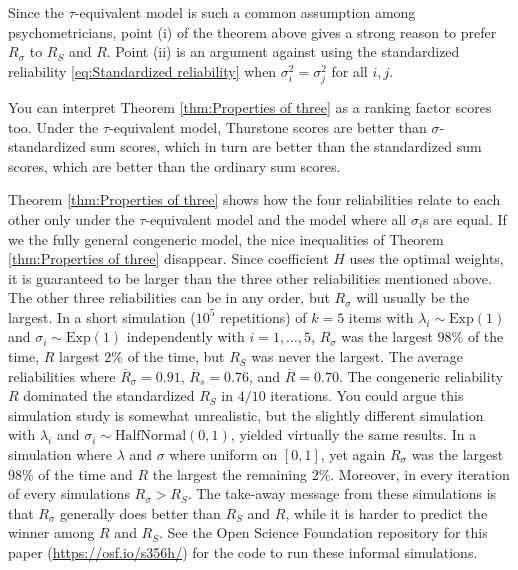 \documentclass[twoside]{article}
\begin{document}
Since the $\tau$-equivalent model is such a common assumption among psychometricians, point (i) of the theorem above gives a strong reason to prefer $ R_{\sigma}$ to $ R_S$ and $ R$. Point (ii) is an argument against using the standardized reliability \eqref{eq:Standardized reliability} when $\sigma_{i}^{2}=\sigma_j^{2}$ for all $i,j$.

You can interpret Theorem \ref{thm:Properties of three} as a ranking factor scores too. Under the $\tau$-equivalent model, Thurstone scores are better than $\sigma$-standardized sum scores, which in turn are better than the standardized sum scores, which are
better than the ordinary sum scores.

Theorem \ref{thm:Properties of three} shows how the four reliabilities relate to each other only under the $\tau$-equivalent model and the model where all $\sigma_i$s are equal. If we the fully general congeneric model, the nice inequalities of Theorem \ref{thm:Properties of three} disappear. Since coefficient $H$ uses the optimal weights, it is guaranteed to be larger than the three other reliabilities mentioned above. The
other three reliabilities can be in any order, but
$ R_{\sigma}$ will usually be the largest. In a short
simulation ($10^{5}$ repetitions) of $k=5$ items with $\lambda_{i}\sim \textrm{Exp}(1)$
and $\sigma_{i}\sim \textrm{Exp}(1)$ independently with $i=1,\ldots,5$, $ R_{\sigma}$
was the largest $98\%$ of the time, $ R$ largest $2\%$
of the time, but $ R_{S}$ was never the largest. The average reliabilities where $\overline{ R}_\sigma = 0.91$, $\overline{ R}_s= 0.76$, and $\overline{ R} = 0.70$.
The congeneric reliability $ R$ dominated the standardized $ R_{S}$ in $4/10$ iterations. You could argue this simulation study
is somewhat unrealistic, but the slightly different simulation with $\lambda_{i}$ and $\sigma_{i}\sim \textrm{HalfNormal}(0,1)$, yielded virtually the same results. In a simulation where $\lambda$ and $\sigma$ where uniform on $[0,1]$, yet again $ R_{\sigma}$
was the largest $98\%$ of the time and $ R$ the largest the remaining $2\%$. Moreover, in every iteration of every simulations $ R_\sigma >  R_S$. The take-away message from these simulations is that $ R_\sigma$ generally does better than $ R_{S}$ and
$ R$, while it is harder to predict the winner among $ R$
and $ R_{S}$. See the Open Science Foundation repository for this paper (\url{https://osf.io/s356h/}) for the code to run these informal simulations.
\end{document}
